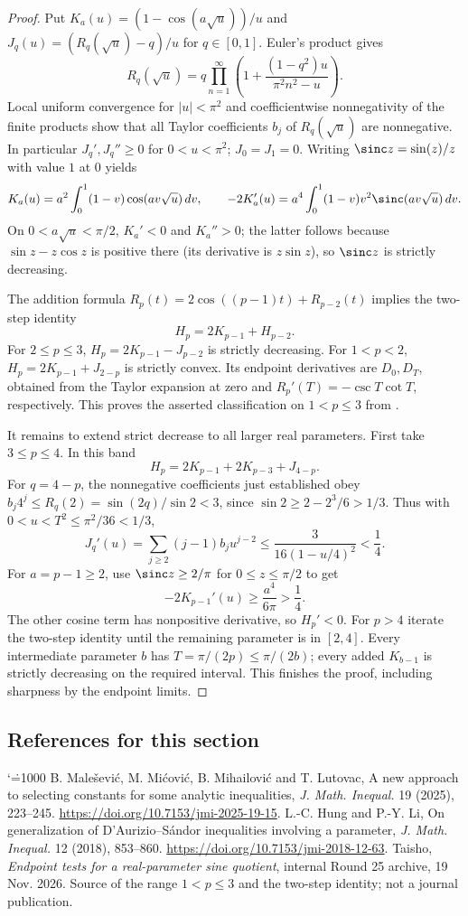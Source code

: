 \documentclass[11pt,a4paper]{article}
\makeatletter
\numberwithin{equation}{section}
\theoremstyle{definition}
\theoremstyle{remark}
\renewenvironment{thebibliography}[1]
 {\subsection*{References for this section}\small
  \list{\@biblabel{\@arabic\c@enumiv}}
       {\settowidth\labelwidth{\@biblabel{#1}}\leftmargin\labelwidth
        \advance\leftmargin\labelsep\@openbib@code
        \usecounter{enumiv}\let\p@enumiv\@empty
        \renewcommand\theenumiv{\@arabic\c@enumiv}}
  \sloppy\clubpenalty4000\widowpenalty4000\sfcode`\.=1000\relax}
 {\def\@noitemerr{\@latex@warning{Empty bibliography}}\endlist}
\makeatother
\begin{document}
\begin{proof}
Put $K_a(u)=(1-\cos(a\sqrt u))/u$ and $J_q(u)=(R_q(\sqrt u)-q)/u$ for $q\in[0,1]$. Euler's product gives
\[
 R_q(\sqrt u)=q\prod_{n=1}^{\infty}
 \left(1+\frac{(1-q^2)u}{\pi^2 n^2-u}\right).
\]
Local uniform convergence for $|u|<\pi^2$ and coefficientwise nonnegativity of the finite products show that all Taylor coefficients $b_j$ of $R_q(\sqrt u)$ are nonnegative. In particular $J_q',J_q''\ge0$ for $0<u<\pi^2$; $J_0=J_1=0$. Writing $\sinc z=\sin(z)/z$ with value $1$ at $0$ yields
\[
K_a(u)=a^2\int_0^1(1-v)\cos(av\sqrt u)\,dv,\qquad
-2K_a'(u)=a^4\int_0^1(1-v)v^2\sinc(av\sqrt u)\,dv.
\]
On $0<a\sqrt u<\pi/2$, $K_a'<0$ and $K_a''>0$; the latter follows because $\sin z-z\cos z$ is positive there (its derivative is $z\sin z$), so $\sinc z$ is strictly decreasing.

The addition formula $R_p(t)=2\cos((p-1)t)+R_{p-2}(t)$ implies the two-step identity
\[
 H_p=2K_{p-1}+H_{p-2}.
\]
For $2\le p\le3$, $H_p=2K_{p-1}-J_{p-2}$ is strictly decreasing. For $1<p<2$, $H_p=2K_{p-1}+J_{2-p}$ is strictly convex. Its endpoint derivatives are $D_0,D_T$, obtained from the Taylor expansion at zero and $R_p'(T)=-\csc T\cot T$, respectively. This proves the asserted classification on $1<p\le3$ from \cite{r33showa:taisho}.

It remains to extend strict decrease to all larger real parameters. First take $3\le p\le4$. In this band
\[
 H_p=2K_{p-1}+2K_{p-3}+J_{4-p}.
\]
For $q=4-p$, the nonnegative coefficients just established obey $b_j4^j\le R_q(2)=\sin(2q)/\sin 2<3$, since $\sin 2\ge 2-2^3/6>1/3$. Thus with $0<u<T^2\le\pi^2/36<1/3$,
\[
 J_q'(u)=\sum_{j\ge2}(j-1)b_ju^{j-2}
 \le \frac{3}{16(1-u/4)^2}<\frac14.
\]
For $a=p-1\ge2$, use $\sinc z\ge2/\pi$ for $0\le z\le\pi/2$ to get
\[
 -2K_{p-1}'(u)\ge \frac{a^4}{6\pi}>\frac14.
\]
The other cosine term has nonpositive derivative, so $H_p'<0$. For $p>4$ iterate the two-step identity until the remaining parameter is in $[2,4]$. Every intermediate parameter $b$ has $T=\pi/(2p)\le\pi/(2b)$; every added $K_{b-1}$ is strictly decreasing on the required interval. This finishes the proof, including sharpness by the endpoint limits.
\end{proof}

\begin{thebibliography}{9}
 B. Male\v sevi\'c, M. Mi\'covi\'c, B. Mihailovi\'c and T. Lutovac, A new approach to selecting constants for some analytic inequalities, \emph{J. Math. Inequal.} 19 (2025), 223--245. \url{https://doi.org/10.7153/jmi-2025-19-15}.
 L.-C. Hung and P.-Y. Li, On generalization of D'Aurizio--S\'andor inequalities involving a parameter, \emph{J. Math. Inequal.} 12 (2018), 853--860. \url{https://doi.org/10.7153/jmi-2018-12-63}.
 Taisho, \emph{Endpoint tests for a real-parameter sine quotient}, internal Round 25 archive, 19 Nov. 2026. Source of the range $1<p\le3$ and the two-step identity; not a journal publication.
\end{thebibliography}
\end{document}
